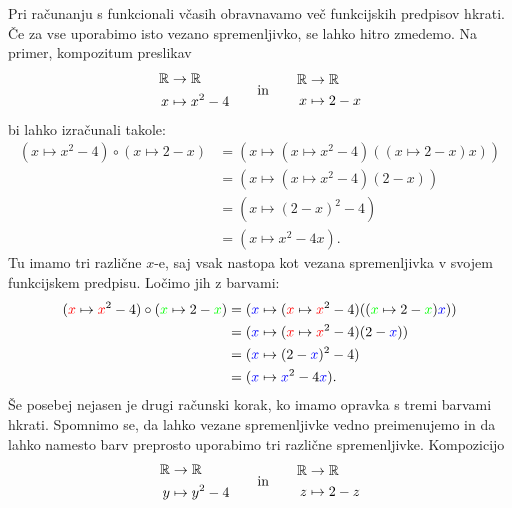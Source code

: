 Pri računanju s funkcionali včasih obravnavamo več funkcijskih predpisov hkrati. Če za vse uporabimo isto vezano spremenljivko, se lahko hitro zmedemo. Na primer, kompozitum preslikav
%
\begin{equation*}
  \begin{aligned}
    \mathbb{R} &\to \mathbb{R} \\
    x &\mapsto x^2 - 4
  \end{aligned}
  \qquad\text{in}\qquad
  \begin{aligned}
    \mathbb{R} &\to \mathbb{R} \\
    x &\mapsto 2 - x
  \end{aligned}
\end{equation*}
%
bi lahko izračunali takole:
%
\begin{align*}
  (x \mapsto x^2  - 4) \circ (x \mapsto 2 - x)
  &= (x \mapsto (x \mapsto x^2 - 4) ((x \mapsto 2 - x) x)) \\
  &= (x \mapsto (x \mapsto x^2 - 4) (2 - x)) \\
  &= (x \mapsto (2 - x)^2 - 4) \\
  &= (x \mapsto x^2 - 4 x).
\end{align*}
%
Tu imamo tri različne $x$-e, saj vsak nastopa kot vezana spremenljivka v svojem funkcijskem predpisu.
%
Ločimo jih z barvami:
%
{%
\newcommand{\redx}{{\color{red}x}}%
\newcommand{\greenx}{{\color{green}x}}%
\newcommand{\bluex}{{\color{blue}x}}%
\begin{align*}
  (\redx \mapsto \redx^2  - 4) \circ (\greenx \mapsto 2 - \greenx)
  &= (\bluex \mapsto (\redx \mapsto \redx^2 - 4) ((\greenx \mapsto 2 - \greenx) \bluex)) \\
  &= (\bluex \mapsto (\redx \mapsto \redx^2 - 4) (2 - \bluex)) \\
  &= (\bluex \mapsto (2 - \bluex)^2 - 4) \\
  &= (\bluex \mapsto \bluex^2 - 4 \bluex).
\end{align*}}%
%
Še posebej nejasen je drugi računski korak, ko imamo opravka s tremi barvami hkrati.
%
Spomnimo se, da lahko vezane spremenljivke vedno preimenujemo in da lahko namesto barv preprosto uporabimo tri različne spremenljivke. Kompozicijo
%
\begin{equation*}
  \begin{aligned}
    \mathbb{R} &\to \mathbb{R} \\
    y &\mapsto y^2 - 4
  \end{aligned}
  \qquad\text{in}\qquad
  \begin{aligned}
    \mathbb{R} &\to \mathbb{R} \\
    z &\mapsto 2 - z
  \end{aligned}
\end{equation*}
